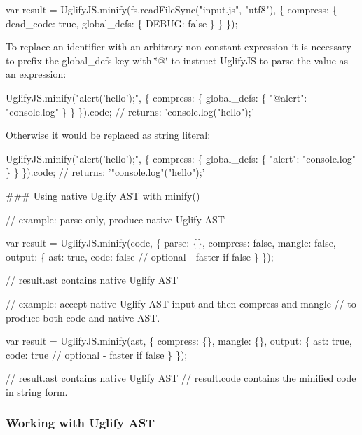 \begin{DoxyCode}
var result = UglifyJS.minify(fs.readFileSync("input.js", "utf8"), \{
    compress: \{
        dead\_code: true,
        global\_defs: \{
            DEBUG: false
        \}
    \}
\});
\end{DoxyCode}


To replace an identifier with an arbitrary non-\/constant expression it is necessary to prefix the {\ttfamily global\+\_\+defs} key with {\ttfamily \char`\"{}@\char`\"{}} to instruct Uglify\+JS to parse the value as an expression\+: 
\begin{DoxyCode}
UglifyJS.minify("alert('hello');", \{
    compress: \{
        global\_defs: \{
            "@alert": "console.log"
        \}
    \}
\}).code;
// returns: 'console.log("hello");'
\end{DoxyCode}


Otherwise it would be replaced as string literal\+: 
\begin{DoxyCode}
UglifyJS.minify("alert('hello');", \{
    compress: \{
        global\_defs: \{
            "alert": "console.log"
        \}
    \}
\}).code;
// returns: '"console.log"("hello");'
\end{DoxyCode}


\#\#\# Using native Uglify A\+ST with {\ttfamily minify()} 
\begin{DoxyCode}
// example: parse only, produce native Uglify AST

var result = UglifyJS.minify(code, \{
    parse: \{\},
    compress: false,
    mangle: false,
    output: \{
        ast: true,
        code: false  // optional - faster if false
    \}
\});

// result.ast contains native Uglify AST
\end{DoxyCode}
 
\begin{DoxyCode}
// example: accept native Uglify AST input and then compress and mangle
//          to produce both code and native AST.

var result = UglifyJS.minify(ast, \{
    compress: \{\},
    mangle: \{\},
    output: \{
        ast: true,
        code: true  // optional - faster if false
    \}
\});

// result.ast contains native Uglify AST
// result.code contains the minified code in string form.
\end{DoxyCode}


\subsubsection*{Working with Uglify A\+ST}

